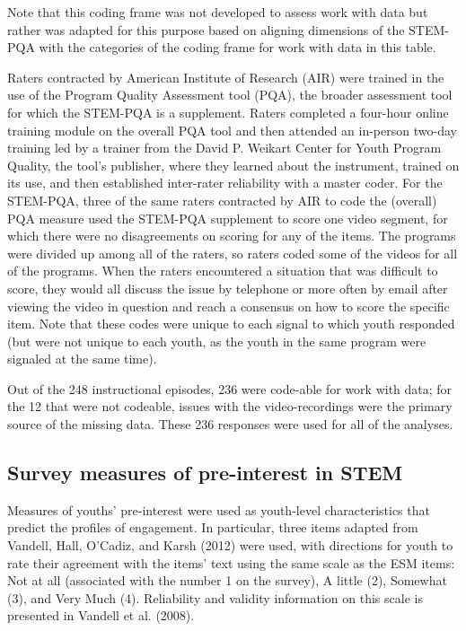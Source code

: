 \documentclass[]{msu-thesis}
\theoremstyle{definition}
\theoremstyle{definition}
\theoremstyle{definition}
\theoremstyle{remark}
\begin{document}
Note that this coding frame was not developed to assess work with data
but rather was adapted for this purpose based on aligning dimensions of
the STEM-PQA with the categories of the coding frame for work with data
in this table.

Raters contracted by American Institute of Research (AIR) were trained
in the use of the Program Quality Assessment tool (PQA), the broader
assessment tool for which the STEM-PQA is a supplement. Raters completed
a four-hour online training module on the overall PQA tool and then
attended an in-person two-day training led by a trainer from the David
P. Weikart Center for Youth Program Quality, the tool's publisher, where
they learned about the instrument, trained on its use, and then
established inter-rater reliability with a master coder. For the
STEM-PQA, three of the same raters contracted by AIR to code the
(overall) PQA measure used the STEM-PQA supplement to score one video
segment, for which there were no disagreements on scoring for any of the
items. The programs were divided up among all of the raters, so raters
coded some of the videos for all of the programs. When the raters
encountered a situation that was difficult to score, they would all
discuss the issue by telephone or more often by email after viewing the
video in question and reach a consensus on how to score the specific
item. Note that these codes were unique to each signal to which youth
responded (but were not unique to each youth, as the youth in the same
program were signaled at the same time).

Out of the 248 instructional episodes, 236 were code-able for work with
data; for the 12 that were not codeable, issues with the
video-recordings were the primary source of the missing data. These 236
responses were used for all of the analyses.

\subsection{Survey measures of pre-interest in
STEM}\label{survey-measures-of-pre-interest-in-stem}

Measures of youths' pre-interest were used as youth-level
characteristics that predict the profiles of engagement. In particular,
three items adapted from Vandell, Hall, O'Cadiz, and Karsh (2012) were
used, with directions for youth to rate their agreement with the items'
text using the same scale as the ESM items: Not at all (associated with
the number 1 on the survey), A little (2), Somewhat (3), and Very Much
(4). Reliability and validity information on this scale is presented in
Vandell et al. (2008).
\end{document}
